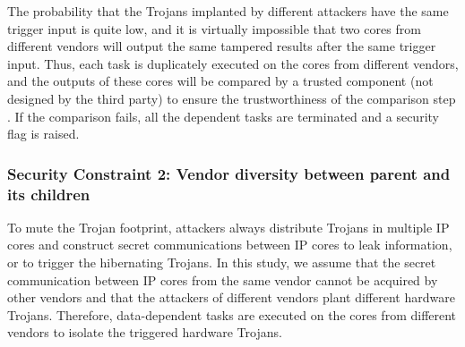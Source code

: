 \documentclass[conference]{IEEEtran}
\begin{document}
The probability that the Trojans implanted by different attackers have the same trigger input is quite low, and it is virtually impossible that two cores from different vendors will output the same tampered results after the same trigger input. Thus, each task is duplicately executed on the cores from different vendors, and the outputs of these cores will be compared by a trusted component (not designed by the third party) to ensure the trustworthiness of the comparison step \cite{conference:DG}. If the comparison fails, all the dependent tasks are terminated and a security flag is raised.


\subsubsection{\textbf{Security Constraint 2}: Vendor diversity between parent and its children}

To mute the Trojan footprint, attackers always distribute Trojans in multiple IP cores and construct secret communications between IP cores to leak information, or to trigger the hibernating Trojans\cite{article:CL}. In this study, we assume that the secret communication between IP cores from the same vendor cannot be acquired by other vendors and that the attackers of different vendors plant different hardware Trojans. Therefore, data-dependent tasks are executed on the cores from different vendors to isolate the triggered hardware Trojans.



\end{document}
